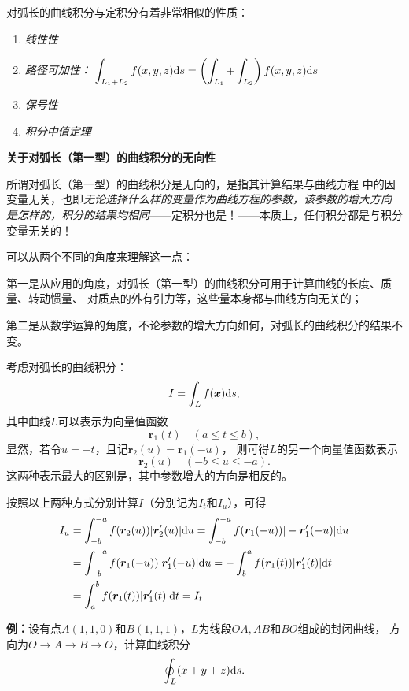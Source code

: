 对弧长的曲线积分与定积分有着非常相似的性质：
\begin{enumerate}
  \setlength{\itemindent}{1cm}
  \item {\it 线性性} 
  \item {\it 路径可加性：}
  $\displaystyle\int_{L_1+L_2}f(x,y,z)\mathrm{d} s=\left(\displaystyle\int_{L_1}+\displaystyle\int_{
  L_2}\right)f(x,y,z)\mathrm{d} s$
  \item {\it 保号性}
  \item {\it 积分中值定理}
\end{enumerate}

\begin{shaded}

{\bf 关于对弧长（第一型）的曲线积分的无向性}

所谓对弧长（第一型）的曲线积分是无向的，是指其计算结果与曲线方程
中的因变量无关，也即{\it 无论选择什么样的变量作为曲线方程的参数，该参数的增大方向
是怎样的，积分的结果均相同}——{定积分也是！}——本质上，任何积分都是与积分变量无关的！

可以从两个不同的角度来理解这一点：

第一是从应用的角度，对弧长（第一型）的曲线积分可用于计算曲线的长度、质量、转动惯量、
对质点的外有引力等，这些量本身都与曲线方向无关的；

第二是从数学运算的角度，不论参数的增大方向如何，对弧长的曲线积分的结果不变。

考虑对弧长的曲线积分：
$$I=\displaystyle\int_Lf(\bm{x})\mathrm{d} s,$$
其中曲线$L$可以表示为向量值函数
$$\bm{r}_1(t)\quad(a\leq t\leq b),$$
显然，若令$u=-t$，且记$\bm{r}_2(u)=\bm{r}_1(-u)$，
则可得$L$的另一个向量值函数表示
$$\bm{r}_2(u)\quad(-b\leq u\leq -a).$$
这两种表示最大的区别是，其中参数增大的方向是相反的。

按照以上两种方式分别计算$I$（分别记为$I_t$和$I_u$），可得
\begin{align*}
	I_u&=\displaystyle\int_{-b}^{-a}f(\bm{r}_2(u))|\bm{r}'_2(u)|\mathrm{d} u
	=\displaystyle\int_{-b}^{-a}f(\bm{r}_1(-u))|-\bm{r}'_1(-u)|\mathrm{d} u\\
	&=\displaystyle\int_{-b}^{-a}f(\bm{r}_1(-u))|\bm{r}'_1(-u)|\mathrm{d} u
	=-\displaystyle\int_{b}^{a}f(\bm{r}_1(t))|\bm{r}'_1(t)|\mathrm{d} t\\
	&=\displaystyle\int_{a}^{b}f(\bm{r}_1(t))|\bm{r}'_1(t)|\mathrm{d} t=I_t
\end{align*}

\end{shaded}


{\bf 例：}设有点$A(1,1,0)$和$B(1,1,1)$，$L$为线段$OA,AB$和$BO$组成的封闭曲线，
方向为$O\to A\to B\to O$，计算曲线积分
$$\oint_L(x+y+z)\mathrm{d} s.$$

